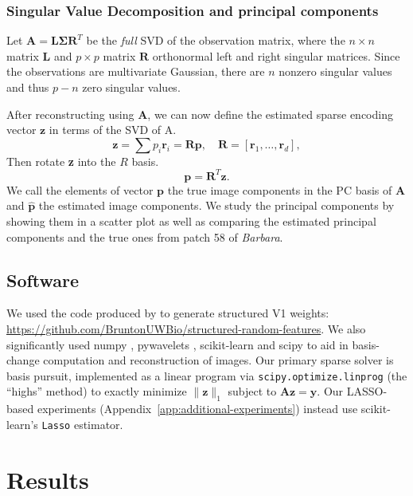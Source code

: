 \documentclass{article}
\renewcommand{\vec}{\mathbf}
\newcommand{\mat}{\mathbf}
\begin{document}
\subsubsection{Singular Value Decomposition and principal components}

Let $\mat{A} = \mat{L} \bm{\Sigma} \mat{R}^T$
be the {\em full} SVD of the observation matrix, 
where the $n \times n$ matrix $\mat{L}$ and 
$p \times p$ matrix $\mat{R}$ orthonormal left and right singular matrices.
Since the observations are multivariate Gaussian, there are $n$ nonzero singular values and thus $p -n $ zero singular values.

After reconstructing using $\mat{A}$, we can now define the estimated sparse encoding vector $\vec{z}$ in terms of the SVD of A. 
\begin{equation}
\vec{z} = \sum p_i \vec{r}_i = \mat{R} \vec{p}, \quad \mat{R} = [ \vec{r}_1, \ldots, \vec{r}_d], 
\end{equation}
Then rotate \textbf{z} into the $R$ basis.
 \begin{equation}
     \vec{p} = \mat{R}^T \vec{z}.
 \end{equation}
We call the elements of vector $\vec{p}$ the true image components in the PC basis of $\mat{A}$ and $\hat{\vec{p}}$ the estimated image components.
We study the principal components by showing them in a scatter plot as well as comparing the estimated principal components and the true ones from patch 58 of \textit{Barbara}.


\subsection{Software}
We used the code produced by \cite{pandeyStructuredRandomReceptive} to generate structured V1 weights: \url{https://github.com/BruntonUWBio/structured-random-features}.
We also significantly used numpy \cite{harrisArrayProgrammingNumPy2020}, pywavelets \cite{leePyWaveletsPythonPackage2019}, scikit-learn \cite{pedregosaScikitlearnMachineLearning} and scipy \cite{virtanenSciPyFundamentalAlgorithms2020} to aid in basis-change computation and reconstruction of images.
Our primary sparse solver is basis pursuit, implemented as a linear program via \texttt{scipy.optimize.linprog} (the ``highs'' method) to exactly minimize $\|\vec z\|_1$ subject to $\mat A \vec z = \vec y$.
Our LASSO-based experiments (Appendix~\ref{app:additional-experiments}) instead use scikit-learn's \texttt{Lasso} estimator.


\section{Results}
\end{document}
